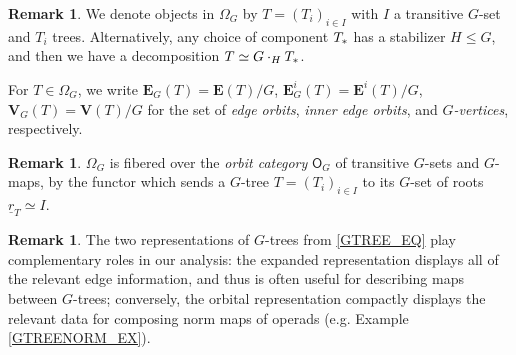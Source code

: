 \documentclass[a4paper,10pt
,draft
]{article}%
\numberwithin{equation}{section}
\numberwithin{figure}{section}
\theoremstyle{definition} %
\newtheorem{remark}[equation]{Remark}%
\DeclareMathOperator{\Aut}{Aut}%
\newcommand{\1}{\ensuremath{\mathbbm 1}}%
\begin{document}
\begin{remark}
      We denote objects in $\Omega_G$ by $T = (T_i)_{i \in I}$ with $I$ a transitive $G$-set and $T_i$ trees.
      Alternatively, any choice of component $T_{\**}$ has a stabilizer $H \leq G$, and then we have a decomposition
      $T \simeq G \cdot_H T_{\**}$.
\end{remark}
For $T \in \Omega_G$, we write
$\boldsymbol{E}_G(T) = \boldsymbol{E}(T)/G$, $\boldsymbol{E}^i_G(T) = \boldsymbol{E}^i(T)/G$, $\boldsymbol{V}_G(T) = \boldsymbol{V}(T)/G$
for the set of \textit{edge orbits}, \textit{inner edge orbits}, and \textit{$G$-vertices}, respectively.

\begin{remark}
      $\Omega_G$ is fibered over the \textit{orbit category} $\mathsf O_G$ of transitive $G$-sets and $G$-maps,
      by the functor which sends a $G$-tree $T = (T_i)_{i \in I}$ to its $G$-set of roots $\underline{r}_T \simeq I$.
\end{remark}


\begin{remark}
      The two representations of $G$-trees from \eqref{GTREE_EQ} play complementary roles in our analysis:
      the expanded representation displays all of the relevant edge information, and thus is often useful for describing maps between $G$-trees;
      conversely, the orbital representation compactly displays the relevant data for composing norm maps of operads (e.g. {\color{blue} Example \ref{GTREENORM_EX}}).
\end{remark}
\end{document}
